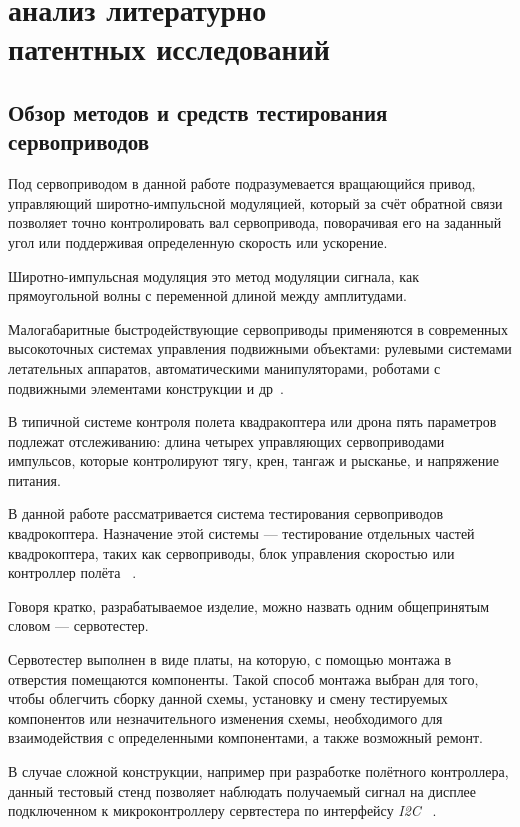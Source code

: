 \section{анализ литературно \\ патентных исследований}

\subsection{Обзор методов и средств тестирования сервоприводов}

Под сервоприводом в данной работе подразумевается вращающийся привод,
управляющий широтно-импульсной модуляцией, который за счёт обратной
связи позволяет точно контролировать вал сервопривода, поворачивая его
на заданный угол или поддерживая определенную скорость или ускорение.

Широтно-импульсная модуляция это метод модуляции сигнала, как
прямоугольной волны с переменной длиной между амплитудами.

Малогабаритные быстродействующие сервоприводы применяются в
современных высокоточных системах управления подвижными объектами:
рулевыми системами летательных аппаратов, автоматическими
манипуляторами, роботами с подвижными элементами конструкции и
др~\cite{dyakovSUBSTANTIATIONRELIABILITYSERVOMOTORS2023}.

В типичной системе контроля полета квадракоптера или дрона пять
параметров подлежат отслеживанию: длина четырех управляющих
сервоприводами импульсов, которые контролируют тягу, крен, тангаж и
рысканье, и напряжение питания.

В данной работе рассматривается система тестирования сервоприводов
квадрокоптера.  Назначение этой системы — тестирование отдельных
частей квадрокоптера, таких как сервоприводы,
блок управления скоростью или контроллер полёта ~\cite{Elector521}.

Говоря кратко, разрабатываемое изделие,
можно назвать одним общепринятым словом — сервотестер.

Сервотестер выполнен в виде платы, на которую, с помощью монтажа в
отверстия помещаются компоненты. Такой способ монтажа выбран для того,
чтобы облегчить сборку данной схемы, установку и смену тестируемых
компонентов или незначительного изменения схемы, необходимого для
взаимодействия с определенными компонентами, а также возможный ремонт.

В случае сложной конструкции, например при разработке полётного
контроллера, данный тестовый стенд позволяет наблюдать получаемый
сигнал на дисплее подключенном к микроконтроллеру сервтестера по
интерфейсу \textit{I2C} ~\cite{Elector521}.

